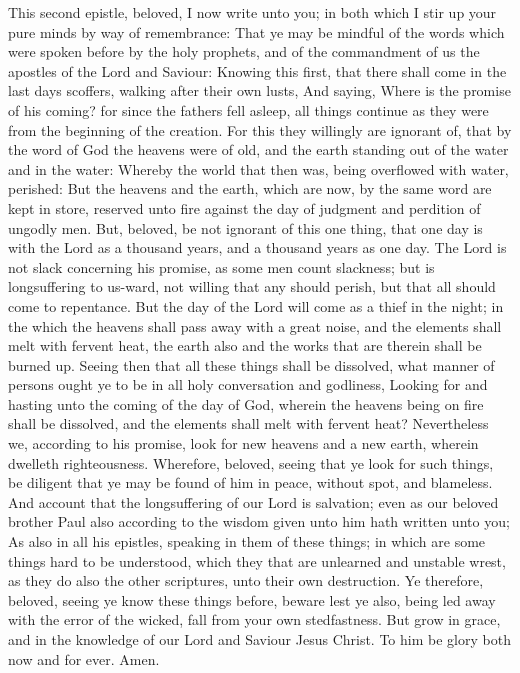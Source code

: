  This second epistle, beloved, I now write unto you; in
both which I stir up your pure minds by way of remembrance:
 That ye may be mindful of the words which were spoken
before by the holy prophets, and of the commandment of us the apostles
of the Lord and Saviour:  Knowing this first, that there
shall come in the last days scoffers, walking after their own lusts,
 And saying, Where is the promise of his coming? for since
the fathers fell asleep, all things continue as they were from the
beginning of the creation.  For this they willingly are
ignorant of, that by the word of God the heavens were of old, and the
earth standing out of the water and in the water:  Whereby
the world that then was, being overflowed with water, perished:
 But the heavens and the earth, which are now, by the same
word are kept in store, reserved unto fire against the day of judgment
and perdition of ungodly men.  But, beloved, be not
ignorant of this one thing, that one day is with the Lord as a thousand
years, and a thousand years as one day.  The Lord is not
slack concerning his promise, as some men count slackness; but is
longsuffering to us-ward, not willing that any should perish, but that
all should come to repentance.  But the day of the Lord
will come as a thief in the night; in the which the heavens shall pass
away with a great noise, and the elements shall melt with fervent heat,
the earth also and the works that are therein shall be burned up.
 Seeing then that all these things shall be dissolved,
what manner of persons ought ye to be in all holy conversation and
godliness,  Looking for and hasting unto the coming of
the day of God, wherein the heavens being on fire shall be dissolved,
and the elements shall melt with fervent heat? 
Nevertheless we, according to his promise, look for new heavens and a
new earth, wherein dwelleth righteousness.  Wherefore,
beloved, seeing that ye look for such things, be diligent that ye may be
found of him in peace, without spot, and blameless.  And
account that the longsuffering of our Lord is salvation; even as our
beloved brother Paul also according to the wisdom given unto him hath
written unto you;  As also in all his epistles, speaking
in them of these things; in which are some things hard to be understood,
which they that are unlearned and unstable wrest, as they do also the
other scriptures, unto their own destruction.  Ye
therefore, beloved, seeing ye know these things before, beware lest ye
also, being led away with the error of the wicked, fall from your own
stedfastness.  But grow in grace, and in the knowledge of
our Lord and Saviour Jesus Christ. To him be glory both now and for
ever. Amen.

